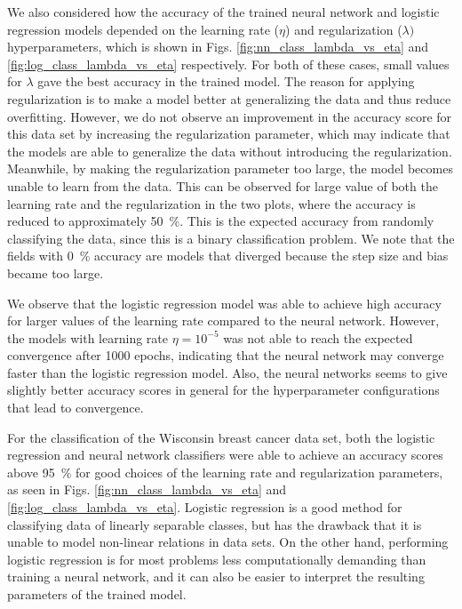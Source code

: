 \documentclass[12pt]{article}
\begin{document}
We also considered how the accuracy of the trained neural network and logistic regression models depended on the learning rate ($\eta$) and regularization ($\lambda)$ hyperparameters, which is shown in Figs. \ref{fig:nn_class_lambda_vs_eta} and \ref{fig:log_class_lambda_vs_eta} respectively. For both of these cases, small values for $\lambda$ gave the best accuracy in the trained model. The reason for applying regularization is to make a model better at generalizing the data and thus reduce overfitting. However, we do not observe an improvement in the accuracy score for this data set by increasing the regularization parameter, which may indicate that the models are able to generalize the data without introducing the regularization. Meanwhile, by making the regularization parameter too large, the model becomes unable to learn from the data. This can be observed for large value of both the learning rate and the regularization in the two plots, where the accuracy is reduced to approximately \SI{50}{\%}. This is the expected accuracy from randomly classifying the data, since this is a binary classification problem. We note that the fields with \SI{0}{\%} accuracy are models that diverged because the step size and bias became too large.

We observe that the logistic regression model was able to achieve high accuracy for larger values of the learning rate compared to the neural network. However, the models with learning rate $\eta = 10^{-5}$ was not able to reach the expected convergence after \num{1000} epochs, indicating that the neural network may converge faster than the logistic regression model. Also, the neural networks seems to give slightly better accuracy scores in general for the hyperparameter configurations that lead to convergence.

For the classification of the Wisconsin breast cancer data set, both the logistic regression and neural network classifiers were able to achieve an accuracy scores above \SI{95}{\%} for good choices of the learning rate and regularization parameters, as seen in Figs. \ref{fig:nn_class_lambda_vs_eta} and \ref{fig:log_class_lambda_vs_eta}. Logistic regression is a good method for classifying data of linearly separable classes, but has the drawback that it is unable to model non-linear relations in data sets. On the other hand, performing logistic regression is for most problems less computationally demanding than training a neural network, and it can also be easier to interpret the resulting parameters of the trained model.
\end{document}
